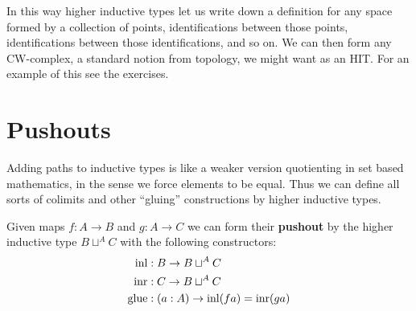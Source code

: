 \documentclass[10pt,oneside,leqno,openright]{memoir}
\begin{document}

In this way higher inductive types let us write down a definition for any space formed by a collection of points, identifications between those points, identifications between those identifications, and so on.
We can then form any CW-complex, a standard notion from topology, we might want as an HIT. For an example of this see the exercises.

\section{Pushouts}

Adding paths to inductive types is like a weaker version quotienting in set based mathematics, in the sense we force elements to be equal.
Thus we can define all sorts of colimits and other ``gluing'' constructions by higher inductive types.

\begin{definition}
    Given maps $f : A \to B$ and $g : A \to C$ we can form their \textbf{pushout} by the higher inductive type $B \sqcup^A C$ with the following constructors:
    \begin{align*}
        \operatorname{inl} &: B \to B \sqcup^A C \\
        \operatorname{inr} &: C \to B \sqcup^A C \\
        \operatorname{glue} &: (a : A) \to \operatorname{inl} (f a) = \operatorname{inr} (g a)
    \end{align*}
\end{definition}
\end{document}

